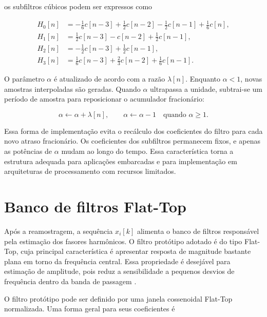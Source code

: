 \noindent os subfiltros cúbicos podem ser expressos como

\begin{align}
H_0[n] &= -\frac{1}{6}c[n-3] + \frac{1}{2}c[n-2] - \frac{1}{2}c[n-1] + \frac{1}{6}c[n],
\label{eq:farrow_h0}\\
H_1[n] &= \frac{1}{2}c[n-3] - c[n-2] + \frac{1}{2}c[n-1],
\label{eq:farrow_h1}\\
H_2[n] &= -\frac{1}{2}c[n-3] + \frac{1}{2}c[n-1],
\label{eq:farrow_h2}\\
H_3[n] &= \frac{1}{6}c[n-3] + \frac{2}{3}c[n-2] + \frac{1}{6}c[n-1].
\label{eq:farrow_h3}
\end{align}

O parâmetro $\alpha$ é atualizado de acordo com a razão $\lambda[n]$. Enquanto $\alpha < 1$, novas amostras interpoladas são geradas. Quando $\alpha$ ultrapassa a unidade, subtrai-se um período de amostra para reposicionar o acumulador fracionário:

\begin{equation}
\alpha \leftarrow \alpha + \lambda[n],
\qquad
\alpha \leftarrow \alpha - 1 \quad \text{quando } \alpha \geq 1.
\label{eq:atualizacao_alpha}
\end{equation}

Essa forma de implementação evita o recálculo dos coeficientes do filtro para cada novo atraso fracionário. Os coeficientes dos subfiltros permanecem fixos, e apenas as potências de $\alpha$ mudam ao longo do tempo. Essa característica torna a estrutura adequada para aplicações embarcadas e para implementação em arquiteturas de processamento com recursos limitados.

\section{Banco de filtros Flat-Top}

Após a reamostragem, a sequência $x_i[k]$ alimenta o banco de filtros responsável pela estimação dos fasores harmônicos. O filtro protótipo adotado é do tipo Flat-Top, cuja principal característica é apresentar resposta de magnitude bastante plana em torno da frequência central. Essa propriedade é desejável para estimação de amplitude, pois reduz a sensibilidade a pequenos desvios de frequência dentro da banda de passagem \cite{duda2016,duda2019}.

O filtro protótipo pode ser definido por uma janela cossenoidal Flat-Top normalizada. Uma forma geral para seus coeficientes é


